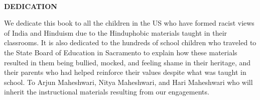 \thispagestyle{empty}
~
\vfill
\begin{center}
\parbox{0.8\textwidth}{%
\centerline{\textbf{DEDICATION}}
\medskip

We dedicate this book to all the children in the US who have
formed racist views of India and Hinduism due to the Hinduphobic
materials taught in their classrooms.
It is also dedicated to the hundreds of school children who traveled
to the State Board of Education in Sacramento to explain how
these materials resulted in them being bullied, mocked, and feeling
shame in their heritage, and their parents who had helped
reinforce their values despite what was taught in school.
To Arjun Maheshwari, Nitya Maheshwari, and Hari Maheshwari
who will inherit the instructional materials resulting from our
engagements.}
\end{center}
\vfill
